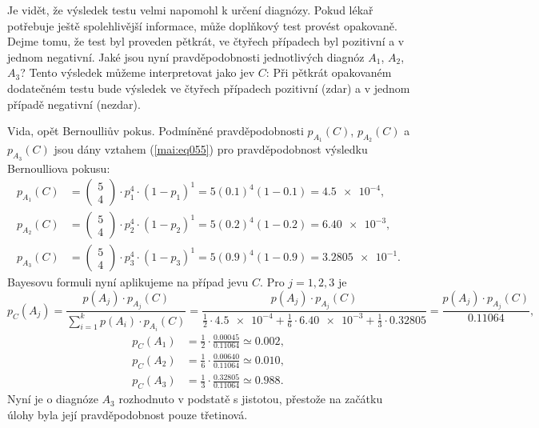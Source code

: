 \begin{example}
  Je vidět, že výsledek testu velmi napomohl k určení diagnózy. Pokud lékař potřebuje ještě 
  spolehlivější informace, může doplňkový test provést opakovaně. Dejme tomu, že test byl proveden 
  pětkrát, ve čtyřech případech byl pozitivní a v jednom negativní. Jaké jsou nyní pravděpodobnosti 
  jednotlivých diagnóz \(A_1\), \(A_2\), \(A_3\)? Tento výsledek můžeme interpretovat jako jev 
  \(C\): Při pětkrát opakovaném dodatečném testu bude výsledek ve čtyřech případech pozitivní (zdar)
  a v jednom případě negativní (nezdar).
  
  Vida, opět Bernoulliův pokus. Podmíněné pravděpodobnosti \(p_{A_1}(C)\), \(p_{A_2}(C)\) a 
  \(p_{A_3}(C)\) jsou dány vztahem (\ref{mai:eq055}) pro pravděpodobnost výsledku Bernoulliova 
  pokusu:
  \begin{align*}
    p_{A_1}(C) &= \begin{pmatrix} 5 \\ 4 \end{pmatrix}\cdot p_1^4\cdot(1-p_1)^1 
                = 5(\num{0.1})^4(1 - \num{0.1}) = \num{4.5e-4},                   \\
    p_{A_2}(C) &= \begin{pmatrix} 5 \\ 4 \end{pmatrix}\cdot p_2^4\cdot(1-p_2)^1
                = 5(\num{0.2})^4(1 - \num{0.2}) = \num{6.40e-3},                  \\
    p_{A_3}(C) &= \begin{pmatrix} 5 \\ 4 \end{pmatrix}\cdot p_3^4\cdot(1-p_3)^1
                = 5(\num{0.9})^4(1 - \num{0.9}) = \num{3.2805e-1}. 
  \end{align*}
  Bayesovu formuli nyní aplikujeme na případ jevu \(C\). Pro \(j = 1, 2, 3\) je
  \begin{equation*}
    p_C(A_j) = \dfrac{p(A_j)\cdot p_{A_j}(C)}{\sum_{i=1}^{k}p(A_i)\cdot p_{A_i}(C)}  
             = \dfrac{p(A_j)\cdot p_{A_j}(C)}{\frac{1}{2}\cdot\num{4.5e-4} + 
                                              \frac{1}{6}\cdot\num{6.40e-3} + 
                                              \frac{1}{3}\cdot\num{0.32805}}
             = \dfrac{p(A_j)\cdot p_{A_j}(C)}{\num{0.11064}},
  \end{equation*}
  \begin{align*}
    p_C(A_1) &= \frac{1}{2} \cdot\frac{\num{0.00045}}{\num{0.11064}}\simeq\num{0.002},     \\
    p_C(A_2) &= \frac{1}{6} \cdot\frac{\num{0.00640}}{\num{0.11064}}\simeq\num{0.010},     \\
    p_C(A_3) &= \frac{1}{3} \cdot\frac{\num{0.32805}}{\num{0.11064}}\simeq\num{0.988}.
  \end{align*}
  Nyní je o diagnóze \(A_3\) rozhodnuto v podstatě s jistotou, přestože na začátku úlohy byla její 
  pravděpodobnost pouze třetinová.
\normalsize
\end{example}
